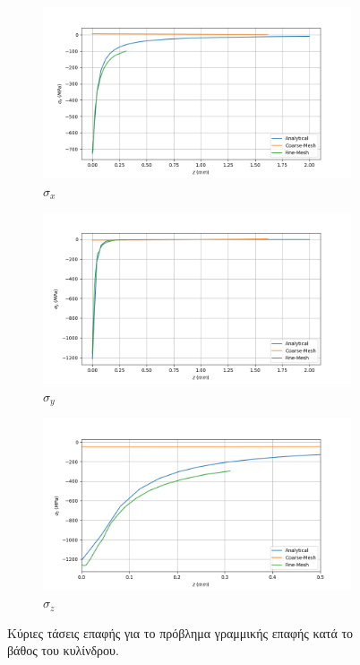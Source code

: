 \documentclass{article}
\begin{document}
\begin{figure}[H]
    \centering
    \begin{subfigure}{0.32\linewidth}
        \centering
        \includegraphics[width=\linewidth]{media/sxlin.png}
        \caption{$\sigma_x$}
    \end{subfigure}
    \hfill
    \begin{subfigure}{0.32\linewidth}
        \centering
        \includegraphics[width= \linewidth]{media/sylin.png}
        \caption{$\sigma_y$}
    \end{subfigure}
    \hfill
    \begin{subfigure}{0.32\linewidth}
        \centering
        \includegraphics[width=\linewidth]{media/szlin.png}
        \caption{$\sigma_z$}
    \end{subfigure}
    \caption{Κύριες τάσεις επαφής για το πρόβλημα γραμμικής επαφής κατά το βάθος του κυλίνδρου.}
    \label{fig:b3}
\end{figure}
\end{document}
